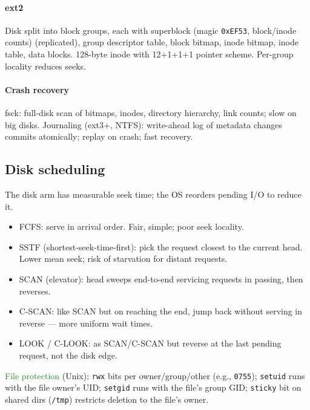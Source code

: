 \paragraph{ext2} Disk split into \textcolor{Bittersweet}{block groups}, each with \textcolor{Bittersweet}{superblock} (magic \texttt{0xEF53}, block/inode counts) (replicated), \textcolor{Bittersweet}{group descriptor table}, \textcolor{Bittersweet}{block bitmap}, \textcolor{Bittersweet}{inode bitmap}, \textcolor{Bittersweet}{inode table}, data blocks. 128-byte inode with 12+1+1+1 pointer scheme. Per-group locality reduces seeks.
\paragraph{Crash recovery}
\textcolor{Bittersweet}{fsck}: full-disk scan of bitmaps, inodes, directory hierarchy, link counts; slow on big disks.
\textcolor{Bittersweet}{Journaling} (ext3+, NTFS): write-ahead log of metadata changes commits atomically; replay on crash; fast recovery.

\subsection{Disk scheduling}
The disk arm has measurable seek time; the OS reorders pending I/O to reduce it.
\begin{itemize}
  \item \textcolor{Bittersweet}{FCFS}: serve in arrival order. Fair, simple; poor seek locality.
  \item \textcolor{Bittersweet}{SSTF} (shortest-seek-time-first): pick the request closest to the current head. Lower mean seek; risk of \textcolor{Bittersweet}{starvation} for distant requests.
  \item \textcolor{Bittersweet}{SCAN} (elevator): head sweeps end-to-end servicing requests in passing, then reverses.
  \item \textcolor{Bittersweet}{C-SCAN}: like SCAN but on reaching the end, jump back without serving in reverse — more uniform wait times.
  \item \textcolor{Bittersweet}{LOOK / C-LOOK}: as SCAN/C-SCAN but reverse at the last pending request, not the disk edge.
\end{itemize}
\textcolor{ForestGreen}{File protection} (Unix): \texttt{rwx} bits per owner/group/other (e.g., \texttt{0755}); \texttt{setuid} runs with the file owner's UID; \texttt{setgid} runs with the file's group GID; \texttt{sticky} bit on shared dirs (\texttt{/tmp}) restricts deletion to the file's owner.

